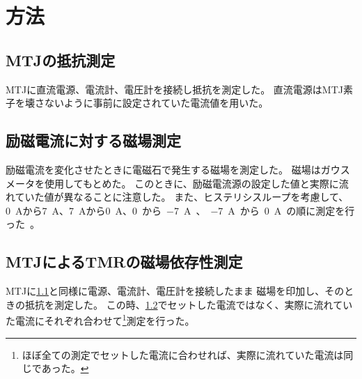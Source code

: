 \documentclass[../../../main]{subfiles}
\begin{document}
\section{方法}

\subsection{MTJの抵抗測定}\label{subsec:method-mtj-resistance}
MTJに直流電源、電流計、電圧計を接続し抵抗を測定した。
直流電源はMTJ素子を壊さないように事前に設定されていた電流値を用いた。

\subsection{励磁電流に対する磁場測定}\label{subsec:method-magnetic-field}
励磁電流を変化させたときに電磁石で発生する磁場を測定した。
磁場はガウスメータを使用してもとめた。
このときに、励磁電流源の設定した値と実際に流れていた値が異なることに注意した。
また、ヒステリシスループを考慮して、\SI{0}{A}から\SI{7}{A}、\SI{7}{A}から\SI{0}{A}、\SI{0}から\SI{-7}{A}、\SI{-7}{A}から\SI{0}{A}の順に測定を行った。

\subsection{MTJによるTMRの磁場依存性測定}
MTJに\ref{subsec:method-mtj-resistance}と同様に電源、電流計、電圧計を接続したまま
磁場を印加し、そのときの抵抗を測定した。
この時、\ref{subsec:method-magnetic-field}でセットした電流ではなく、実際に流れていた電流にそれぞれ合わせて\footnote{
	ほぼ全ての測定でセットした電流に合わせれば、実際に流れていた電流は同じであった。
}測定を行った。
\end{document}
